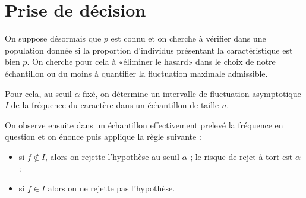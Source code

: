 \documentclass[12pt,a4paper,french]{article}
\begin{document}
\section{Prise de décision}

On suppose désormais que $p$ est connu et on cherche à vérifier dans une
population donnée si la proportion d'individus présentant la
caractéristique est bien $p$. On cherche pour cela à «éliminer le
hasard» dans le choix de notre échantillon ou du moins à quantifier la
fluctuation maximale admissible.

Pour cela, au seuil $\alpha$ fixé, on détermine un intervalle de
fluctuation asymptotique $I$ de la fréquence du caractère dans un
échantillon de taille $n$.

On observe ensuite dans un échantillon effectivement prelevé la
fréquence en question et on énonce puis applique la règle suivante :
\begin{itemize}
  \item si $f \notin I$, alors on rejette l'hypothèse au seuil $\alpha$
    ; le risque de rejet à tort est $\alpha$ ;
  \item si $f \in I$ alors on ne rejette pas l'hypothèse.
\end{itemize}
\end{document}
